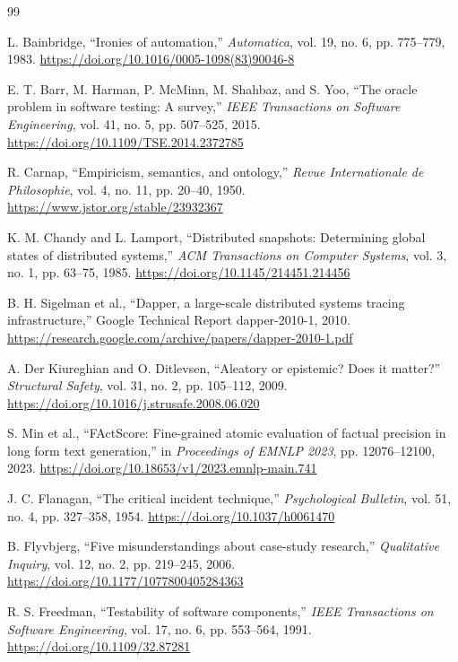 \documentclass[10pt,a4paper]{article}
\begin{document}
\small
\begin{thebibliography}{99}

L. Bainbridge, ``Ironies of automation,'' \emph{Automatica}, vol. 19, no. 6, pp. 775--779, 1983. \url{https://doi.org/10.1016/0005-1098(83)90046-8}

E. T. Barr, M. Harman, P. McMinn, M. Shahbaz, and S. Yoo, ``The oracle problem in software testing: A survey,'' \emph{IEEE Transactions on Software Engineering}, vol. 41, no. 5, pp. 507--525, 2015. \url{https://doi.org/10.1109/TSE.2014.2372785}

R. Carnap, ``Empiricism, semantics, and ontology,'' \emph{Revue Internationale de Philosophie}, vol. 4, no. 11, pp. 20--40, 1950. \url{https://www.jstor.org/stable/23932367}

K. M. Chandy and L. Lamport, ``Distributed snapshots: Determining global states of distributed systems,'' \emph{ACM Transactions on Computer Systems}, vol. 3, no. 1, pp. 63--75, 1985. \url{https://doi.org/10.1145/214451.214456}

B. H. Sigelman et al., ``Dapper, a large-scale distributed systems tracing infrastructure,'' Google Technical Report dapper-2010-1, 2010. \url{https://research.google.com/archive/papers/dapper-2010-1.pdf}

A. Der Kiureghian and O. Ditlevsen, ``Aleatory or epistemic? Does it matter?'' \emph{Structural Safety}, vol. 31, no. 2, pp. 105--112, 2009. \url{https://doi.org/10.1016/j.strusafe.2008.06.020}

S. Min et al., ``FActScore: Fine-grained atomic evaluation of factual precision in long form text generation,'' in \emph{Proceedings of EMNLP 2023}, pp. 12076--12100, 2023. \url{https://doi.org/10.18653/v1/2023.emnlp-main.741}

J. C. Flanagan, ``The critical incident technique,'' \emph{Psychological Bulletin}, vol. 51, no. 4, pp. 327--358, 1954. \url{https://doi.org/10.1037/h0061470}

B. Flyvbjerg, ``Five misunderstandings about case-study research,'' \emph{Qualitative Inquiry}, vol. 12, no. 2, pp. 219--245, 2006. \url{https://doi.org/10.1177/1077800405284363}

R. S. Freedman, ``Testability of software components,'' \emph{IEEE Transactions on Software Engineering}, vol. 17, no. 6, pp. 553--564, 1991. \url{https://doi.org/10.1109/32.87281}


\end{thebibliography}
\end{document}
